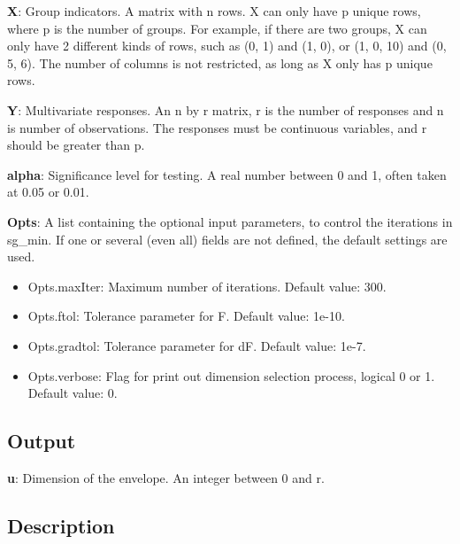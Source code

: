 \documentclass[a4paper,11pt,openany]{memoir}
\begin{document}
\begin{par}
\textbf{X}: Group indicators. A matrix with n rows.  X can only have p unique  rows, where p is the number of groups. For example, if there are two groups, X can only have 2 different kinds of rows, such as (0, 1) and (1, 0), or (1, 0, 10) and (0, 5, 6).  The number of columns is not restricted, as long as X only has p unique rows.
\end{par} \vspace{1em}
\begin{par}
\textbf{Y}: Multivariate responses. An n by r matrix, r is the number of responses and n is number of observations. The responses must be continuous variables, and r should be greater than p.
\end{par} \vspace{1em}
\begin{par}
\textbf{alpha}: Significance level for testing.  A real number between 0 and 1, often taken at 0.05 or 0.01.
\end{par} \vspace{1em}
\begin{par}
\textbf{Opts}: A list containing the optional input parameters, to control the iterations in sg\_min. If one or several (even all) fields are not defined, the default settings are used.
\end{par} \vspace{1em}
\begin{itemize}
\setlength{\itemsep}{-1ex}
   \item Opts.maxIter: Maximum number of iterations.  Default value: 300.
   \item Opts.ftol: Tolerance parameter for F.  Default value: 1e-10.
   \item Opts.gradtol: Tolerance parameter for dF.  Default value: 1e-7.
   \item Opts.verbose: Flag for print out dimension selection process, logical 0 or 1. Default value: 0.
\end{itemize}


\subsection*{Output}

\begin{par}
\textbf{u}: Dimension of the envelope. An integer between 0 and r.
\end{par} \vspace{1em}


\subsection*{Description}
\end{document}
